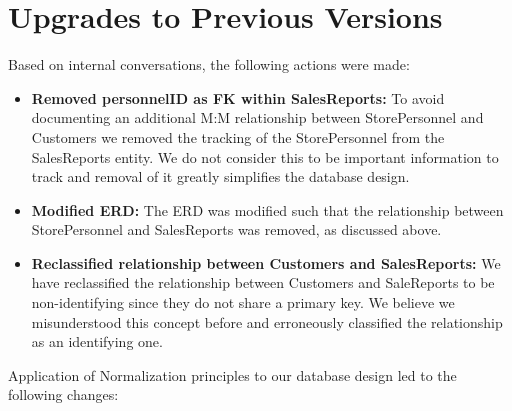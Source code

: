 \documentclass{article}
\begin{document}
\section{Upgrades to Previous Versions}

\begin{tcolorbox}[colback=secondarycolor, colframe=primarycolor, arc=5mm]
Based on internal conversations, the following actions were made:
\vspace{0.2cm}
\begin{itemize}
  \item \textbf{Removed personnelID as FK within SalesReports:} To avoid documenting an additional M:M relationship between StorePersonnel and Customers we removed the tracking of the StorePersonnel from the SalesReports entity. We do not consider this to be important information to track and removal of it greatly simplifies the database design.
  \vspace{0.1cm}
  \item \textbf{Modified ERD:} The ERD was modified such that the relationship between StorePersonnel and SalesReports was removed, as discussed above.
  \vspace{0.1cm}
  \item \textbf{Reclassified relationship between Customers and SalesReports:} We have reclassified the relationship between Customers and SaleReports to be non-identifying since they do not share a primary key. We believe we misunderstood this concept before and erroneously classified the relationship as an identifying one.
  \end{itemize}
\vspace{0.2cm}

Application of Normalization principles to our database design led to the following changes:


\end{tcolorbox}
\end{document}

